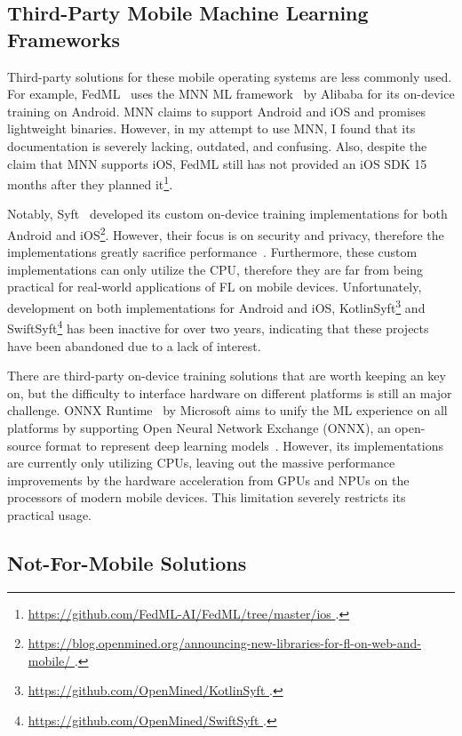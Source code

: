 \documentclass[conference]{IEEEtran}
\begin{document}
\subsection{Third-Party Mobile Machine Learning Frameworks}

Third-party solutions for these mobile operating systems are less commonly used.
For example, FedML~\cite{he2020fedml} uses
the MNN ML framework~\cite{jiang2020mnn,lv2022walle} by Alibaba for
its on-device training on Android.
MNN claims to support Android and iOS and promises lightweight binaries.
However, in my attempt to use MNN, I found that its documentation is
severely lacking, outdated, and confusing.
Also, despite the claim that MNN supports iOS,
FedML still has not provided an iOS SDK 15 months after they planned
it\footnote{\url{
    https://github.com/FedML-AI/FedML/tree/master/ios
}.}.

Notably, Syft~\cite{ryffel2018generic,Ziller2021,hall2021syft} developed
its custom on-device training implementations for
both Android and iOS\footnote{\url{
    https://blog.openmined.org/announcing-new-libraries-for-fl-on-web-and-mobile/
}.}.
However, their focus is on security and privacy,
therefore the implementations greatly sacrifice
performance~\cite{ryffel2018generic}.
Furthermore, these custom implementations can only utilize the CPU,
therefore they are far from being practical for real-world applications of
FL on mobile devices.
Unfortunately, development on
both implementations for Android and iOS,
KotlinSyft\footnote{\url{
    https://github.com/OpenMined/KotlinSyft
}.} and SwiftSyft\footnote{\url{
    https://github.com/OpenMined/SwiftSyft
}.} has been inactive for over two years,
indicating that these projects have been abandoned due to a lack of interest.

There are third-party on-device training solutions that are worth keeping an key on,
but the difficulty to interface hardware on different platforms is
still an major challenge.
ONNX Runtime~\cite{onnxruntime} by Microsoft aims to
unify the ML experience on all platforms by
supporting Open Neural Network Exchange (ONNX),
an open-source format to represent deep learning
models~\cite{ParedesdelRio2020}.
However, its implementations are currently only utilizing CPUs,
leaving out the massive performance improvements by the hardware acceleration
from GPUs and NPUs on the processors of modern mobile devices.
This limitation severely restricts its practical usage.

\subsection{Not-For-Mobile Solutions}
\end{document}
